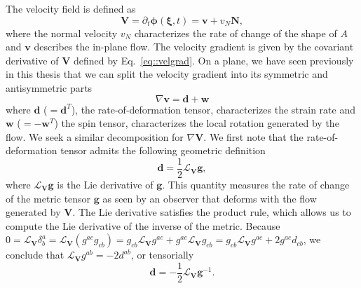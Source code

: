 The velocity field is defined as
\begin{equation} \label{14_II}
	\bm{V} = \partial_t \bm{\phi}(\bm{\xi},t) = \bm{v} + v_N \bm{N},
\end{equation}
where the normal velocity $v_N$ characterizes the rate of change of the shape of $A$ and $\bm{v}$ describes the in-plane flow. The velocity gradient is given by the covariant derivative of $\bm{V}$ defined by Eq.~\eqref{eq::velgrad}. On a plane, we have seen previously in this thesis that we can split the velocity gradient into its symmetric and antisymmetric parts
\begin{equation}\label{qwe}
	\nabla\bm{v} = \bm{d} + \bm{w}
\end{equation}
where $\bm{d}$ ($=\bm{d}^T$), the rate-of-deformation tensor, characterizes the strain rate and $\bm{w}$ ($=-\bm{w}^T$) the spin tensor, characterizes the local rotation generated by the flow. We seek a similar decomposition for $\nabla\bm{V}$. We first note that the rate-of-deformation tensor admits the following geometric definition \cite{marsden1994}
\begin{equation}\label{eq6:lie-der}
	\bm{d}=\frac{1}{2}\mathcal{L}_{\bm{V}}\bm{g},
\end{equation}
where $\mathcal{L}_{\bm{V}}\bm{g}$ is the Lie derivative of $\bm{g}$. This quantity measures the rate of change of the metric tensor $\bm{g}$ as seen by an observer that deforms with the flow generated by $\bm{V}$. The Lie derivative satisfies the product rule, which allows us to compute the Lie derivative of the inverse of the metric. Because $0 = \mathcal{L}_{\bm{V}} \delta^a_b = \mathcal{L}_{\bm{V}}(g^{ac}g_{cb}) = g_{cb}\mathcal{L}_{\bm{V}}g^{ac} + g^{ac}\mathcal{L}_{\bm{V}}g_{cb} = g_{cb}\mathcal{L}_{\bm{V}}g^{ac} + 2 g^{ac}d_{cb}$, we conclude that $\mathcal{L}_{\bm{V}}g^{ab} = -2 d^{ab}$, or tensorially 
\begin{equation}\label{eq6:lie-der_}
	\bm{d}= - \frac{1}{2}\mathcal{L}_{\bm{V}}\bm{g}^{-1}.
\end{equation}

